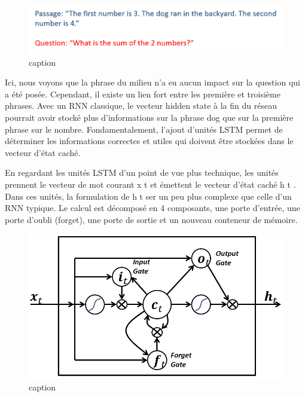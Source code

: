 \documentclass[11pt]{article}
\makeatletter
\def\maxwidth{\ifdim\Gin@nat@width>\linewidth\linewidth
    \else\Gin@nat@width\fi}
\let\Oldincludegraphics\includegraphics
\renewcommand{\includegraphics}[1]{\Oldincludegraphics[width=.8\maxwidth]{#1}}
\makeatother
\begin{document}
\begin{figure}
\centering
\includegraphics{Images/SentimentAnalysis4.png}
\caption{caption}
\end{figure}

Ici, nous voyons que la phrase du milieu n'a eu aucun impact sur la
question qui a été posée. Cependant, il existe un lien fort entre les
première et troisième phrases. Avec un RNN classique, le vecteur hidden
state à la fin du réseau pourrait avoir stocké plus d'informations sur
la phrase dog que sur la première phrase sur le nombre.
Fondamentalement, l'ajout d'unités LSTM permet de déterminer les
informations correctes et utiles qui doivent être stockées dans le
vecteur d'état caché.

En regardant les unités LSTM d'un point de vue plus technique, les
unités prennent le vecteur de mot courant x t et émettent le vecteur
d'état caché h t . Dans ces unités, la formulation de h t ser un peu
plus complexe que celle d'un RNN typique. Le calcul est décomposé en 4
composants, une porte d'entrée, une porte d'oubli (forget), une porte de
sortie et un nouveau conteneur de mémoire.

\begin{figure}
\centering
\includegraphics{Images/SentimentAnalysis10.png}
\caption{caption}
\end{figure}
\end{document}

